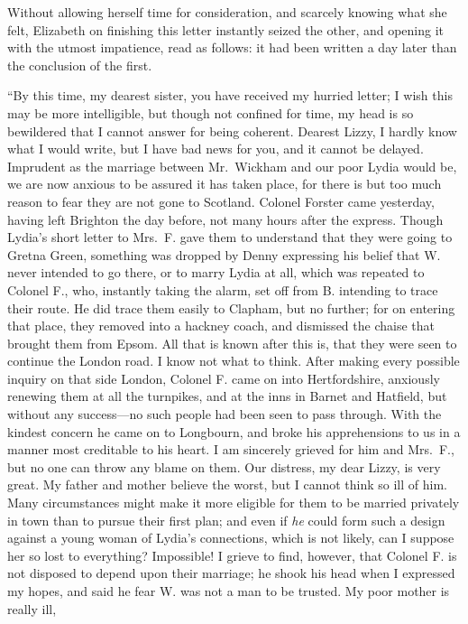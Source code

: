 Without allowing herself time for consideration, and scarcely
knowing what she felt, Elizabeth on finishing this letter instantly
seized the other, and opening it with the utmost impatience, read
as follows: it had been written a day later than the conclusion of
the first.

\bigskip
``By this time, my dearest sister, you have received my hurried
letter; I wish this may be more intelligible, but though not
confined for time, my head is so bewildered that I cannot answer
for being coherent.  Dearest Lizzy, I hardly know what I would
write, but I have bad news for you, and it cannot be delayed.
Imprudent as the marriage between Mr.\ Wickham and our poor
Lydia would be, we are now anxious to be assured it has taken
place, for there is but too much reason to fear they are not gone
to Scotland.  Colonel Forster came yesterday, having left
Brighton the day before, not many hours after the express.
Though Lydia's short letter to Mrs.\ F. gave them to understand
that they were going to Gretna Green, something was dropped
by Denny expressing his belief that W. never intended to go
there, or to marry Lydia at all, which was repeated to Colonel
F., who, instantly taking the alarm, set off from B. intending to
trace their route.  He did trace them easily to Clapham, but no
further; for on entering that place, they removed into a hackney
coach, and dismissed the chaise that brought them from Epsom.
All that is known after this is, that they were seen to continue
the London road.  I know not what to think.  After making every
possible inquiry on that side London, Colonel F. came on into
Hertfordshire, anxiously renewing them at all the turnpikes, and
at the inns in Barnet and Hatfield, but without any success---no
such people had been seen to pass through.  With the kindest
concern he came on to Longbourn, and broke his apprehensions
to us in a manner most creditable to his heart.  I am sincerely
grieved for him and Mrs.\ F., but no one can throw any blame
on them.  Our distress, my dear Lizzy, is very great.  My father
and mother believe the worst, but I cannot think so ill of him.
Many circumstances might make it more eligible for them to be
married privately in town than to pursue their first plan;
and even if \emph{he} could form such a design against a young woman
of Lydia's connections, which is not likely, can I suppose her
so lost to everything?  Impossible!  I grieve to find, however,
that Colonel F. is not disposed to depend upon their marriage;
he shook his head when I expressed my hopes, and said he fear
W. was not a man to be trusted.  My poor mother is really ill,
